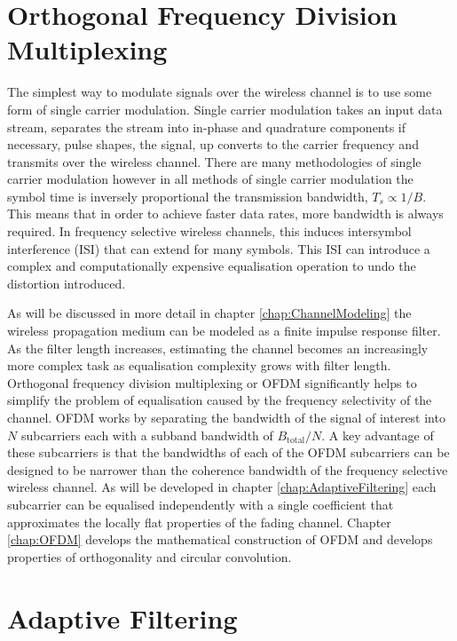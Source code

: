 \section{Orthogonal Frequency Division Multiplexing}
\label{sec:OFDMIntro}
The simplest way to modulate signals over the wireless %
channel is to use some form of single carrier modulation. %
Single carrier modulation takes an input data stream, %
separates the stream into in-phase and quadrature components %
if necessary, pulse shapes, the signal, up converts to the %
carrier frequency and transmits over the wireless channel. %
There are many methodologies of single carrier modulation %
however in all methods of single carrier modulation %
the symbol time is inversely proportional the transmission %
bandwidth, $T_{s} \propto 1/B$. This means that in order to %
achieve faster data rates, more bandwidth is always required. %
In frequency selective wireless channels, this induces intersymbol %
interference (ISI) that can extend for many symbols. This ISI %
can introduce a complex and computationally expensive equalisation %
operation to undo the distortion introduced.

As will be discussed in more detail in chapter %
\ref{chap:ChannelModeling} the wireless propagation medium can be %
modeled as a finite impulse response filter\cite{Jer00}. 
As the filter length increases, estimating %
the channel becomes an increasingly more complex task as %
equalisation complexity grows with filter length. %
Orthogonal frequency division multiplexing or OFDM significantly %
helps to simplify the problem of equalisation caused by %
the frequency selectivity of the channel. OFDM works by %
separating the bandwidth of the signal of interest into %
$N$ subcarriers each with a subband bandwidth of %
$B_{\text{total}}/N$. A key advantage of these subcarriers %
is that the bandwidths of each of the OFDM subcarriers can %
be designed to be narrower than the coherence bandwidth %
of the frequency selective wireless channel. As will be %
developed in chapter \ref{chap:AdaptiveFiltering} each %
subcarrier can be equalised independently with a single %
coefficient that approximates the locally flat properties %
of the fading channel. Chapter \ref{chap:OFDM} develops %
the mathematical construction of OFDM and develops %
properties of orthogonality and circular convolution.
\newpage
\section{Adaptive Filtering}

